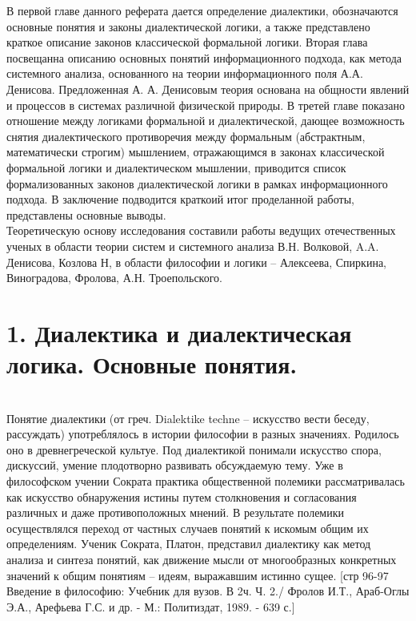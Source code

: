\documentclass[a4paper,12pt]{report}
\begin{document}
	В первой главе данного реферата дается  определение диалектики, обозначаются основные понятия и законы диалектической логики, а также представлено краткое описание законов классической формальной логики.  Вторая глава посвещанна описанию основных понятий информационного подхода, как метода системного анализа, основанного на теории информационного поля А.А. Денисова. Предложенная А. А. Денисовым теория основана на общности явлений и процессов в системах различной физической природы. В третей главе показано отношение между логиками формальной и диалектической, дающее возможность снятия диалектического  противоречия между формальным (абстрактным, математически строгим) мышлением, отражающимся в законах классической формальной логики и диалектическом мышлении, приводится список формализованных законов диалектической логики в рамках информационного подхода. В заключение подводится краткоий итог проделанной работы, представлены основные выводы.  
\\

	Теоретическую основу исследования составили работы ведущих отечественных ученых в области теории систем и системного анализа В.Н. Волковой, A.A. Денисова, Козлова Н, в области философии и логики  – Алексеева, Спиркина, Виноградова, Фролова, А.Н. Троепольского.\\



\chapter*{1.  Диалектика и диалектическая логика. Основные понятия. }
 \\

Понятие диалектики (от греч. Dialektike techne – искусство вести беседу, рассуждать) употреблялось в истории философии в разных значениях. Родилось оно в древнегреческой культуе. Под диалектикой понимали искусство спора, дискуссий, умение плодотворно развивать обсуждаемую тему. Уже в философском учении Сократа практика общественной полемики рассматривалась как искусство обнаружения истины путем столкновения и согласования различных и даже противоположных мнений. В результате полемики осуществлялся переход от частных случаев понятий к искомым общим их определениям. Ученик Сократа, Платон, представил диалектику как метод анализа и синтеза понятий, как движение мысли от многообразных конкретных значений к общим понятиям – идеям, выражавшим истинно сущее. [стр 96-97  Введение в философию: Учебник для вузов. В 2ч. Ч. 2./ Фролов И.Т., Араб-Оглы Э.А., Арефьева Г.С. и др. - М.: Политиздат, 1989. - 639 с.] \\
\end{document}
